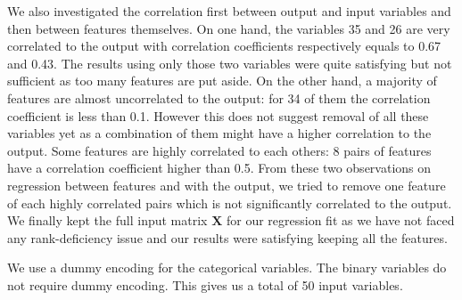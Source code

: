\documentclass{article} %
\begin{document}
  We also investigated the correlation first between output and input variables and then between features themselves. On one hand, the variables  35 and 26 are very correlated to the output with correlation coefficients respectively equals to 0.67 and 0.43. The results using only those two variables were quite satisfying but not sufficient as too many features are put aside. On the other hand, a majority of features are almost uncorrelated to the output: for 34 of them the correlation coefficient is less than 0.1. However this does not suggest removal of all these variables yet as a combination of them might have a higher correlation to the output. Some features are highly correlated to each others: 8 pairs of features have a correlation coefficient higher than 0.5. From these two observations on regression between features and with the output, we tried to remove one feature of each highly correlated pairs which is not significantly correlated to the output. We finally kept the full input matrix  $\mathbf{X}$ for our regression fit as we have not faced any rank-deficiency issue and our results were satisfying keeping all the features.

  We use a dummy encoding for the categorical variables. The binary variables do not require dummy encoding. This gives us a total of 50 input variables.
\end{document}
